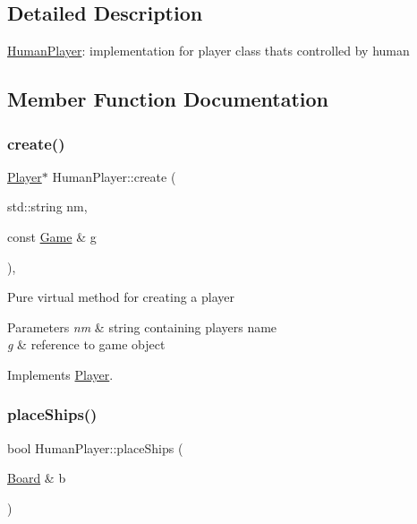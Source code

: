 \subsection{Detailed Description}
\mbox{\hyperlink{class_human_player}{Human\+Player}}\+: implementation for player class that\textquotesingle{}s controlled by human 

\subsection{Member Function Documentation}
\mbox{\label{class_human_player_ac369ccb03a62b40dcf3dc157841a965e}} 
\subsubsection{\texorpdfstring{create()}{create()}}
{\footnotesize\ttfamily \mbox{\hyperlink{class_player}{Player}}$\ast$ Human\+Player\+::create (\begin{DoxyParamCaption}\item[{std\+::string}]{nm,  }\item[{const \mbox{\hyperlink{class_game}{Game}} \&}]{g }\end{DoxyParamCaption})\hspace{0.3cm}{\ttfamily [inline]}, {\ttfamily [virtual]}}

Pure virtual method for creating a player 
\begin{DoxyParams}{Parameters}
{\em nm} & string containing player\textquotesingle{}s name \\
\hline
{\em g} & reference to game object \\
\hline
\end{DoxyParams}


Implements \mbox{\hyperlink{class_player_a9b9133f3347894da1416953048cecdb2}{Player}}.

\mbox{\label{class_human_player_ae9315a3c66f6b2f2bf4d1ebb09669aff}} 
\subsubsection{\texorpdfstring{place\+Ships()}{placeShips()}}
{\footnotesize\ttfamily bool Human\+Player\+::place\+Ships (\begin{DoxyParamCaption}\item[{\mbox{\hyperlink{class_board}{Board}} \&}]{b }\end{DoxyParamCaption})\hspace{0.3cm}{\ttfamily [virtual]}}

